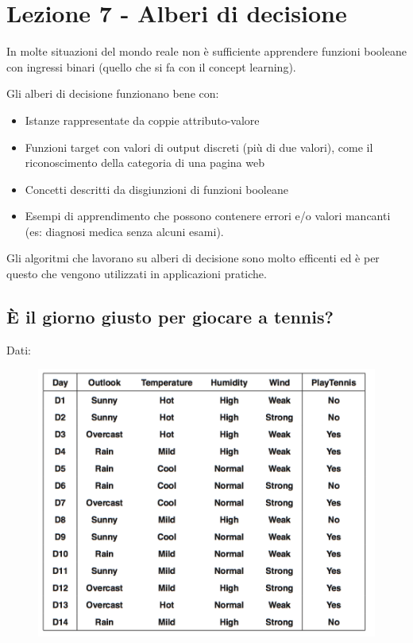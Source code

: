 \section{Lezione 7 - Alberi di
decisione}\label{lezione-7---alberi-di-decisione}

In molte situazioni del mondo reale non è sufficiente apprendere
funzioni booleane con ingressi binari (quello che si fa con il concept
learning).

Gli alberi di decisione funzionano bene con:

\begin{itemize}
\tightlist
\item
  Istanze rappresentate da coppie attributo-valore
\item
  Funzioni target con valori di output discreti (più di due valori),
  come il riconoscimento della categoria di una pagina web
\item
  Concetti descritti da disgiunzioni di funzioni booleane
\item
  Esempi di apprendimento che possono contenere errori e/o valori
  mancanti (es: diagnosi medica senza alcuni esami).
\end{itemize}

Gli algoritmi che lavorano su alberi di decisione sono molto efficenti
ed è per questo che vengono utilizzati in applicazioni pratiche.

\subsection{È il giorno giusto per giocare a
tennis?}\label{uxe8-il-giorno-giusto-per-giocare-a-tennis}

Dati:

\begin{figure}[htbp]
\centering
\includegraphics{./notes/immagini/l7-tabella.png}
\caption{}
\end{figure}

